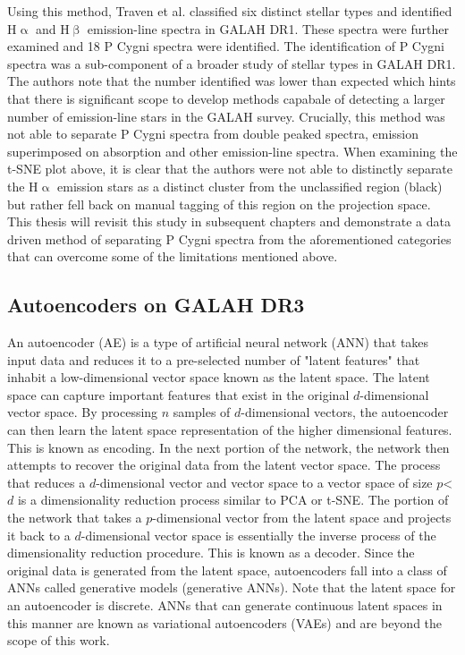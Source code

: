 Using this method, Traven et al. classified six distinct stellar types and identified H$\upalpha$ and H$\upbeta$ emission-line spectra in GALAH DR1. These spectra were further examined and 18 P Cygni spectra were identified. The identification of P Cygni spectra was a sub-component of a broader study of stellar types in GALAH DR1. The authors note that the number identified was lower than expected which hints that there is significant scope to develop methods capabale of detecting a larger number of emission-line stars in the GALAH survey. Crucially, this method was not able to separate P Cygni spectra from double peaked spectra, emission superimposed on absorption and other emission-line spectra. When examining the t-SNE plot above, it is clear that the authors were not able to distinctly separate the H$\upalpha$ emission stars as a distinct cluster from the unclassified region (black) but rather fell back on manual tagging of this region on the projection space. This thesis will revisit this study in subsequent chapters and demonstrate a data driven method of separating P Cygni spectra from the aforementioned categories that can overcome some of the limitations mentioned above.

\subsection{Autoencoders on GALAH DR3}

An autoencoder (AE) is a type of artificial neural network (ANN) that takes input data and reduces it to a pre-selected number of "latent features" that inhabit a low-dimensional vector space known as the latent space. The latent space can capture important features that exist in the original $d$-dimensional vector space. By processing $n$ samples of $d$-dimensional vectors, the autoencoder can then learn the latent space representation of the higher dimensional features. This is known as encoding. In the next portion of the network, the network then attempts to recover the original data from the latent vector space. The process that reduces a $d$-dimensional vector and vector space to a vector space of size $p$<$d$ is a dimensionality reduction process similar to PCA or t-SNE. The portion of the network that takes a $p$-dimensional vector from the latent space and projects it back to a $d$-dimensional vector space is essentially the inverse process of the dimensionality reduction procedure. This is known as a decoder. Since the original data is generated from the latent space, autoencoders fall into a class of ANNs called generative models (generative ANNs). Note that the latent space for an autoencoder is discrete. ANNs that can generate continuous latent spaces in this manner are known as variational autoencoders (VAEs) and are beyond the scope of this work. 

